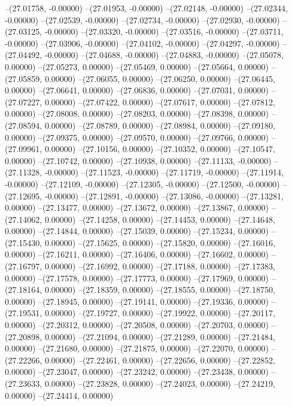 --(27.01758, -0.00000)
--(27.01953, -0.00000)
--(27.02148, -0.00000)
--(27.02344, -0.00000)
--(27.02539, -0.00000)
--(27.02734, -0.00000)
--(27.02930, -0.00000)
--(27.03125, -0.00000)
--(27.03320, -0.00000)
--(27.03516, -0.00000)
--(27.03711, -0.00000)
--(27.03906, -0.00000)
--(27.04102, -0.00000)
--(27.04297, -0.00000)
--(27.04492, -0.00000)
--(27.04688, -0.00000)
--(27.04883, -0.00000)
--(27.05078, 0.00000)
--(27.05273, 0.00000)
--(27.05469, 0.00000)
--(27.05664, 0.00000)
--(27.05859, 0.00000)
--(27.06055, 0.00000)
--(27.06250, 0.00000)
--(27.06445, 0.00000)
--(27.06641, 0.00000)
--(27.06836, 0.00000)
--(27.07031, 0.00000)
--(27.07227, 0.00000)
--(27.07422, 0.00000)
--(27.07617, 0.00000)
--(27.07812, 0.00000)
--(27.08008, 0.00000)
--(27.08203, 0.00000)
--(27.08398, 0.00000)
--(27.08594, 0.00000)
--(27.08789, 0.00000)
--(27.08984, 0.00000)
--(27.09180, 0.00000)
--(27.09375, 0.00000)
--(27.09570, 0.00000)
--(27.09766, 0.00000)
--(27.09961, 0.00000)
--(27.10156, 0.00000)
--(27.10352, 0.00000)
--(27.10547, 0.00000)
--(27.10742, 0.00000)
--(27.10938, 0.00000)
--(27.11133, -0.00000)
--(27.11328, -0.00000)
--(27.11523, -0.00000)
--(27.11719, -0.00000)
--(27.11914, -0.00000)
--(27.12109, -0.00000)
--(27.12305, -0.00000)
--(27.12500, -0.00000)
--(27.12695, -0.00000)
--(27.12891, -0.00000)
--(27.13086, -0.00000)
--(27.13281, 0.00000)
--(27.13477, 0.00000)
--(27.13672, 0.00000)
--(27.13867, 0.00000)
--(27.14062, 0.00000)
--(27.14258, 0.00000)
--(27.14453, 0.00000)
--(27.14648, 0.00000)
--(27.14844, 0.00000)
--(27.15039, 0.00000)
--(27.15234, 0.00000)
--(27.15430, 0.00000)
--(27.15625, 0.00000)
--(27.15820, 0.00000)
--(27.16016, 0.00000)
--(27.16211, 0.00000)
--(27.16406, 0.00000)
--(27.16602, 0.00000)
--(27.16797, 0.00000)
--(27.16992, 0.00000)
--(27.17188, 0.00000)
--(27.17383, 0.00000)
--(27.17578, 0.00000)
--(27.17773, 0.00000)
--(27.17969, 0.00000)
--(27.18164, 0.00000)
--(27.18359, 0.00000)
--(27.18555, 0.00000)
--(27.18750, 0.00000)
--(27.18945, 0.00000)
--(27.19141, 0.00000)
--(27.19336, 0.00000)
--(27.19531, 0.00000)
--(27.19727, 0.00000)
--(27.19922, 0.00000)
--(27.20117, 0.00000)
--(27.20312, 0.00000)
--(27.20508, 0.00000)
--(27.20703, 0.00000)
--(27.20898, 0.00000)
--(27.21094, 0.00000)
--(27.21289, 0.00000)
--(27.21484, 0.00000)
--(27.21680, 0.00000)
--(27.21875, 0.00000)
--(27.22070, 0.00000)
--(27.22266, 0.00000)
--(27.22461, 0.00000)
--(27.22656, 0.00000)
--(27.22852, 0.00000)
--(27.23047, 0.00000)
--(27.23242, 0.00000)
--(27.23438, 0.00000)
--(27.23633, 0.00000)
--(27.23828, 0.00000)
--(27.24023, 0.00000)
--(27.24219, 0.00000)
--(27.24414, 0.00000)
